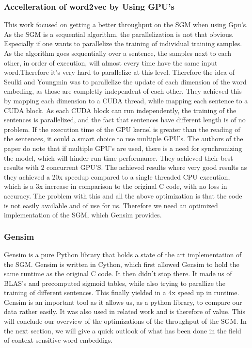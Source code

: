\subsubsection{Accelleration of word2vec by Using GPU's}
This work \cite{gpu} focused on getting a better throughput on the SGM when using Gpu's. As the SGM is a sequential algorithm, the parallelization is not that obvious. Especially if one wants to parallelize the training of individual training samples. As the algorithm goes sequentially over a sentence,  the samples next to each other, in order of execution, will almost every time have the same input word.Therefore it's very hard to parallelize at this level.  Therefore the idea of Seulki and Youngmin \cite{gpu} was to parallelize the update of each dimension of the word embeding, as those are completly independent of each other. They achieved this by mapping each dimension to a CUDA thread, while mapping each sentence to a CUDA block. As each CUDA block can run independently, the training of the sentences is parallelized, and the fact that sentences have different length is of no problem. If the execution time of the GPU kernel is greater than the reading of the sentences, it could a smart choice to use multiple GPU's. The authors of the paper do note that if multiple GPU's are used, there is a need for synchronizing the model, which will hinder run time performance. They achieved their best results with 2 concurrent GPU'S. The achieved results where very good results as they achieved a 20x speedup compared to a single threaded CPU execution, which is a 3x increase in comparison to the original C code, with no loss in accuracy.  The problem with this and all the above optimization is that the code is not easily available and of use for us. Therefore we need an optimized implementation of the SGM, which Gensim \cite{gensim} provides. 
\subsubsection{Gensim}
Gensim \cite{gensim} is a pure Python library that holds a state of the art implementation of the SGM. Gensim is written in Cython, which first allowed Gensim to hold the same runtime as the original C code. It then didn't stop there. It made us of BLAS's and precomputed sigmoid tables, while also trying to parallize the training of different sentences. This finally yielded in a 4x speed up in runtime.  Gensim is an important tool as it allows us, as a python library, to compare our data rather easily. It was also used in related work \cite{intel} and is therefore of value. This will conclude our overview of the optimizations of the throughput of the SGM. In the next section, we will give a quick outlook of what has been done in the field of context sensitive word embeddigs.



